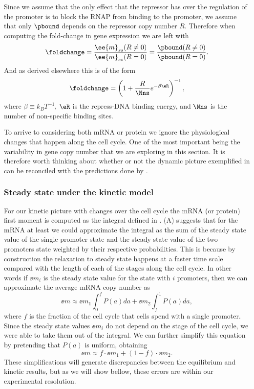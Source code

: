 Since we assume that the only effect that the repressor has over the regulation
of the promoter is to block the RNAP from binding to the promoter, we assume
that only $\pbound$ depends on the repressor copy number $R$. Therefore when
computing the fold-change in gene expression we  are left with
\begin{equation}
  \foldchange = {\ee{m}_{ss}(R \neq 0) \over \ee{m}_{ss}(R = 0)}
              = {\pbound (R \neq 0) \over \pbound (R = 0)}.
\end{equation}
And as derived elsewhere this is of the form \cite{Garcia2011c}
\begin{equation}
  \foldchange = \left(1 + {R \over \Nns}e^{-\beta \eR}  \right)^{-1},
  \label{eq_fold_change_thermo}
\end{equation}
where $\beta \equiv k_BT^{-1}$, $\eR$ is the repress-DNA binding energy, and
$\Nns$ is the number of non-specific binding sites.

To arrive to  considering both mRNA or protein we
ignore the physiological changes that happen along the cell cycle. One of the
most important being the variability in gene copy number that we are exploring
in this section. It is therefore worth thinking about whether or not the dynamic
picture exemplified in  can be reconciled with the
predictions done by .

\subsubsection{Steady state under the kinetic model}

For our kinetic picture with changes over the cell cycle the mRNA (or protein)
first moment is computed as the integral defined in .
(A) suggests that for the mRNA at least we could
approximate the integral as the sum of the steady state value of the
single-promoter state and the steady state value of the two-promoters state
weighted by their respective probabilities. This is because by construction the
relaxation to steady state happens at a faster time scale compared with the
length of each of the stages along the cell cycle. In other words if $\ee{m}_i$
is the steady state value for the state with $i$ promoters, then we can
approximate the average mRNA copy number as
\begin{equation}
  \ee{m} \approx \ee{m}_1 \int_0^{f} P(a)da +
                 \ee{m}_2 \int_f^{1} P(a)da,
\end{equation}
where $f$ is the fraction of the cell cycle that cells spend with a single
promoter. Since the steady state values $\ee{m}_i$ do not depend on the stage
of the cell cycle, we were able to take them out of the integral. We can further
simplify this equation by pretending that $P(a)$ is uniform, obtaining
\begin{equation}
  \ee{m} \approx f \cdot \ee{m}_1 + (1 - f) \cdot \ee{m}_2.
  \label{eq_mRNA_mean_simplified}
\end{equation}
These simplifications will generate discrepancies between the equilibrium and
kinetic results, but as we will show bellow, these errors are within our
experimental resolution.

